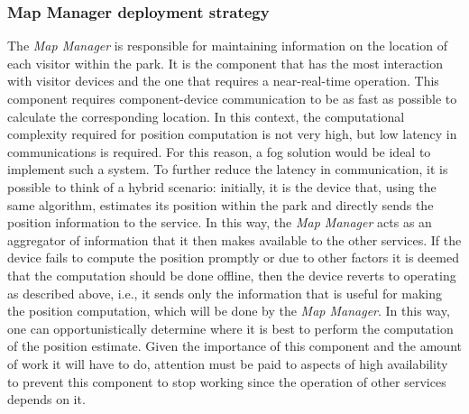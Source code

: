 \subsubsection{Map Manager deployment strategy}
The \textit{Map Manager} is responsible for maintaining information on the location of each visitor within the park. It is the component that has the
most interaction with visitor devices and the one that requires a near-real-time operation. This component requires component-device communication to
be as fast as possible to calculate the corresponding location. In this context, the computational complexity required for position computation is
not very high, but low latency in communications is required. For this reason, a fog solution would be ideal to implement such a system. To further
reduce the latency in communication, it is possible to think of a hybrid scenario: initially, it is the device that, using the same algorithm,
estimates its position within the park and directly sends the position information to the service. In this way, the \textit{Map Manager} acts as an
aggregator of information that it then makes available to the other services. If the device fails to compute the position promptly or due to other
factors it is deemed that the computation should be done offline, then the device reverts to operating as described above, i.e., it sends only the
information that is useful for making the position computation, which will be done by the \textit{Map Manager}. In this way, one can
opportunistically determine where it is best to perform the computation of the position estimate.
Given the importance of this component and the amount of work it will have to do, attention must be paid to aspects of high availability to prevent
this component to stop working since the operation of other services depends on it.